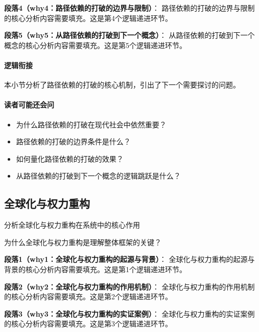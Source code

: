 \documentclass[../main.tex]{subfiles}
\begin{document}
{{\textbf{段落4（why4：路径依赖的打破的边界与限制）}：
路径依赖的打破的边界与限制的核心分析内容需要填充。这是第4个逻辑递进环节。


\textbf{段落5（why5：从路径依赖的打破到下一个概念）}：
从路径依赖的打破到下一个概念的核心分析内容需要填充。这是第5个逻辑递进环节。


\paragraph*{逻辑衔接}
本小节分析了路径依赖的打破的核心机制，引出了下一个需要探讨的问题。

\paragraph*{读者可能还会问}
\begin{itemize}
\item 为什么路径依赖的打破在现代社会中依然重要？
\item 路径依赖的打破的边界条件是什么？
\item 如何量化路径依赖的打破的效果？
\item 从路径依赖的打破到下一个概念的逻辑跳跃是什么？
\end{itemize}


\subsection{全球化与权力重构}

\begin{motivation}
分析全球化与权力重构在系统中的核心作用
\end{motivation}

\begin{logicmap}
[逻辑链占位]
\end{logicmap}

\begin{questionbox}
为什么全球化与权力重构是理解整体框架的关键？
\end{questionbox}

\textbf{段落1（why1：全球化与权力重构的起源与背景）}：
全球化与权力重构的起源与背景的核心分析内容需要填充。这是第1个逻辑递进环节。


\textbf{段落2（why2：全球化与权力重构的作用机制）}：
全球化与权力重构的作用机制的核心分析内容需要填充。这是第2个逻辑递进环节。


\textbf{段落3（why3：全球化与权力重构的实证案例）}：
全球化与权力重构的实证案例的核心分析内容需要填充。这是第3个逻辑递进环节。


}}
\end{document}
